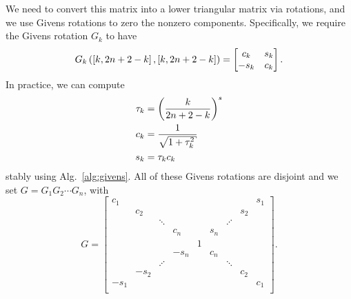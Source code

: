 We need to convert this matrix into a lower triangular matrix via rotations,
and we use Givens rotations to zero the nonzero components.
Specifically, we require the Givens rotation $G_{k}$ to have
%
\begin{equation}
    G_{k}\left( \left[ k,2n+2-k \right],\left[ k,2n+2-k \right] \right) = 
        \begin{bmatrix} c_{k} & s_{k} \\ -s_{k} & c_{k} \end{bmatrix}.
\end{equation}
%
In practice, we can compute 
%
\begin{align}
    \tau_{k} &= \parens{\frac{k}{2n+2-k}}^{s} \nonumber\\
    c_{k} &= \frac{1}{\sqrt{1 + \tau_{k}^{2}}} \nonumber\\
    s_{k} &= \tau_{k}c_{k}
    \label{eq:v1_I_2n_Givens_cs_def}
\end{align}
%
stably using Alg.~\ref{alg:givens}.
All of these Givens rotations are
disjoint and we set $G = G_{1}G_{2}\cdots G_{n}$, with
%
\begin{equation}
    G = \begin{bmatrix}
        c_{1} &       &        &       &      &       &        &       & s_{1}\\
              & c_{2} &        &       &      &       &        & s_{2} &      \\
              &       & \ddots &       &      &       & \iddots&       &      \\
              &       &        & c_{n} &      & s_{n} &        &       &      \\
              &       &        &       &    1 &       &        &       &      \\
              &       &        & -s_{n}&      & c_{n} &        &       &      \\
              &       & \iddots&       &      &       & \ddots &       &      \\
              &-s_{2} &        &       &      &       &        & c_{2} &      \\
        -s_{1}&       &        &       &      &       &        &       & c_{1}\\
        \end{bmatrix}.
    \label{eq:vand_I_Givens}
\end{equation}

